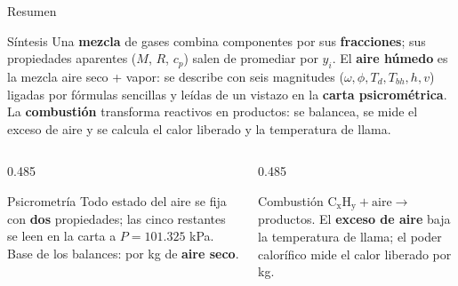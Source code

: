 \documentclass[aspectratio=169,10pt]{beamer}
\begin{document}
\begin{frame}{Resumen}
\begin{cardidea}{Síntesis}{\faLightbulb}
Una \textbf{mezcla} de gases combina componentes por sus \textbf{fracciones}; sus propiedades aparentes ($M$, $R$, $c_p$) salen de promediar por $y_i$. El \textbf{aire húmedo} es la mezcla aire seco + vapor: se describe con seis magnitudes ($\omega,\phi,T_d,T_{bh},h,v$) ligadas por fórmulas sencillas y leídas de un vistazo en la \textbf{carta psicrométrica}. La \textbf{combustión} transforma reactivos en productos: se balancea, se mide el exceso de aire y se calcula el calor liberado y la temperatura de llama.
\end{cardidea}
\vspace{2mm}
\begin{columns}[T]
\begin{column}{0.485\textwidth}
\begin{cardgear}{Psicrometría}{\faTint}
Todo estado del aire se fija con \textbf{dos} propiedades; las cinco restantes se leen en la carta a $P=101.325$ kPa. Base de los balances: por kg de \textbf{aire seco}.
\end{cardgear}
\end{column}
\begin{column}{0.485\textwidth}
\begin{cardgear}{Combustión}{\faFire}
$\mathrm{C_xH_y}+\text{aire}\to$ productos. El \textbf{exceso de aire} baja la temperatura de llama; el poder calorífico mide el calor liberado por kg.
\end{cardgear}
\end{column}
\end{columns}
\end{frame}
\end{document}
